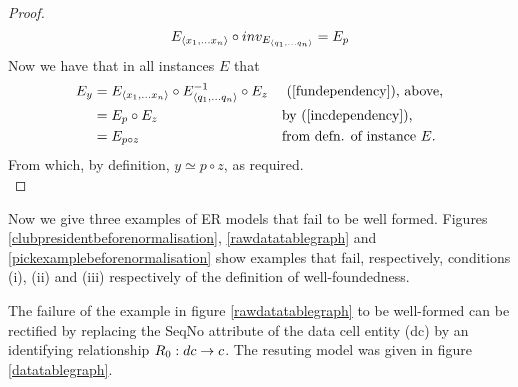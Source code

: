 \begin{proof}
\begin{equation}
\label{incdependency}
E_{\langle x_1,...x_n\rangle} \circ inv_{E_{\langle q_1,...q_n\rangle}} = E_p
\end{equation}
Now we have  that in all instances $E$ that 
\begin{align*}
E_y &= E_{\langle x_1,...x_n\rangle} \circ E_{\langle q_1,...q_n\rangle}^{-1} \circ E_z  && \text{ (\ref{fundependency}), above,}\\
    &= E_p \circ E_z                                   && \text{by (\ref{incdependency}),}\\
		&= E_{p \circ z}                                   && \text{from defn. of instance }E.\\
\end{align*} 
\vspace{-0.3cm}
From which, by definition, $y\simeq p \circ z$, as required. \\
\end{proof}
Now we give three examples of ER models that fail to be well formed. 
Figures \ref{clubpresidentbeforenormalisation}, \ref{rawdatatablegraph} and  \ref{pickexamplebeforenormalisation}
show examples that fail, respectively, conditions (i), (ii) and (iii) respectively of the definition of well-foundedness. 

The failure of the example in figure \ref{rawdatatablegraph} to be well-formed can be rectified by 
replacing the SeqNo attribute of 
the data cell entity (dc) by an identifying relationship $R_0:dc \rightarrow c$. The resuting model was given in figure \ref{datatablegraph}.


